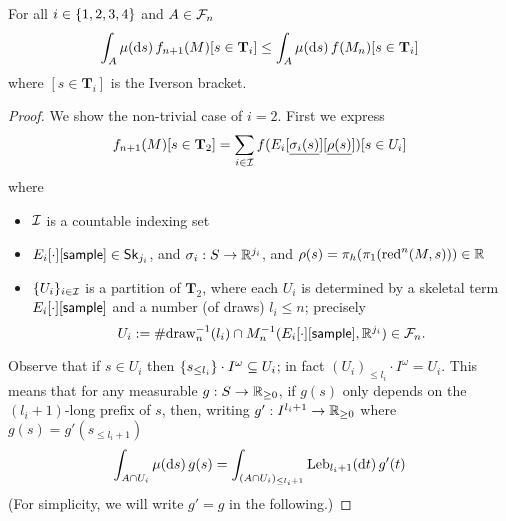 \begin{lemma}
For all $i \in \{1, 2, 3, 4\}$ and $A \in \mathcal{F}_n$
\[
\int_A \mu(\mathrm{d} s) \, f_{n+1}(M)[s \in \mathbf{T}_i] \leq \int_A \mu(\mathrm{d} s) \, f(M_n)[s \in \mathbf{T}_i]
\] 
where $[s \in \mathbf{T}_i]$ is the Iverson bracket.
\end{lemma}

\begin{proof}
We show the non-trivial case of $i = 2$.
First we express 
\begin{equation}
f_{n+1}(M)[s \in \mathbf{T}_2] = \sum_{i \in \mathcal{I}} 
f(E_i[\underline{\sigma_i(s)}][\underline{\rho(s)}])[s \in U_i]
\label{eqn:f 2 n+1}
\end{equation}
where 
\begin{itemize}
\item $\mathcal{I}$ is a countable indexing set
\item $E_i[\cdot][\textsf{sample}] \in \mathsf{Sk}_{j_i}$, and $\sigma_i : S \to \mathbb{R}^{j_i}$, and $\rho(s) = \pi_h(\pi_1(\operatorname{red}^n(M, s))) \in \mathbb{R}$ 
\item $\{U_i\}_{i \in \mathcal{I}}$ is a partition of $\mathbf{T}_2$, 
where each $U_i$ is determined by a skeletal term $E_i[\cdot][\textsf{sample}]$ and a number (of draws) $l_i \leq n$;
precisely 
\[
U_i := \#\mathrm{draw}_n^{-1}(l_i) \cap M_n^{-1}(E_i[\cdot][\textsf{sample}], \mathbb{R}^{j_i}) \in \mathcal{F}_n.
\]
\end{itemize}

Observe that if $s \in U_i$ then $\{s_{\leq l_i}\} \cdot I^\omega \subseteq U_i$;
in fact $(U_i)_{\leq l_i} \cdot I^\omega = U_i$.
This means that for any measurable $g : S \to \mathbb{R}_{\geq 0}$, if $g(s)$ only depends on the $(l_i+1)$-long prefix of $s$, then, writing $g' : I^{l_i+1} \to \mathbb{R}_{\geq 0}$ where $g(s) = g'(s_{\leq l_i+1})$ 
\begin{equation}
\int_{A \cap U_i}  \mu(\mathrm{d} s) \, g(s) = 
\int_{(A \cap U_i)_{\leq l_i+1}} \mathrm{Leb}_{l_i+1}(\mathrm{d} t) \, g'(t)
\label{eqn:truncate}
\end{equation}
(For simplicity, we will write $g' = g$ in the following.)


\end{proof}
